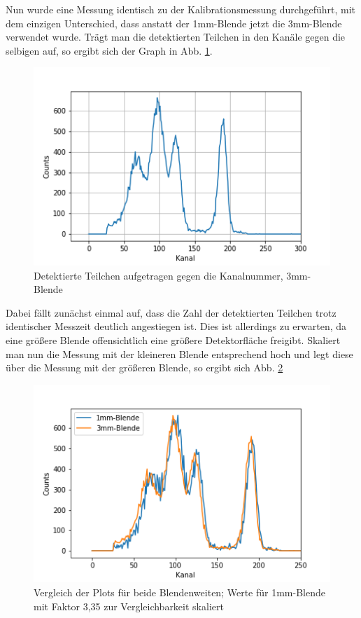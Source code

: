 Nun wurde eine Messung identisch zu der Kalibrationsmessung durchgeführt, mit dem einzigen Unterschied, dass anstatt der 1mm-Blende 
jetzt die 3mm-Blende verwendet wurde. Trägt man die detektierten Teilchen in den Kanäle gegen die selbigen auf, so ergibt sich der 
Graph in Abb. \ref{bild:blende}. \\

\begin{figure}[h]
    \centering
    \includegraphics[scale=0.75]{Bilder/blende.png}
    \caption{Detektierte Teilchen aufgetragen gegen die Kanalnummer, 3mm-Blende}
    \label{bild:blende}
\end{figure}

Dabei fällt zunächst einmal auf, dass die Zahl der detektierten Teilchen trotz identischer Messzeit deutlich angestiegen ist. Dies ist 
allerdings zu erwarten, da eine größere Blende offensichtlich eine größere Detektorfläche freigibt. Skaliert man nun die Messung 
mit der kleineren Blende entsprechend hoch und legt diese über die Messung mit der größeren Blende, so ergibt sich Abb. 
\ref{bild:blendebeide}

\begin{figure}[h]
    \captionsetup{justification=centering,margin=2cm}
    \centering
    \includegraphics[scale=0.75]{Bilder/blendebeide.png}
    \caption{Vergleich der Plots für beide Blendenweiten; Werte für 1mm-Blende mit Faktor 3,35 zur Vergleichbarkeit skaliert}
    \label{bild:blendebeide}
\end{figure}

